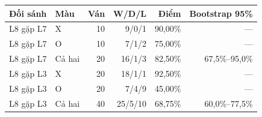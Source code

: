 \begin{center}\small
\begin{tabular}{@{}llrrrr@{}}
\toprule
Đối sánh & Màu & Ván & W/D/L & Điểm & Bootstrap 95\% \\
\midrule
L8 gặp L7 & X & 10 & 9/0/1 & 90,00\% & — \\
L8 gặp L7 & O & 10 & 7/1/2 & 75,00\% & — \\
L8 gặp L7 & Cả hai & 20 & 16/1/3 & 82,50\% & 67,5\%–95,0\% \\
L8 gặp L3 & X & 20 & 18/1/1 & 92,50\% & — \\
L8 gặp L3 & O & 20 & 7/4/9 & 45,00\% & — \\
L8 gặp L3 & Cả hai & 40 & 25/5/10 & 68,75\% & 60,0\%–77,5\% \\
\bottomrule
\end{tabular}
\end{center}